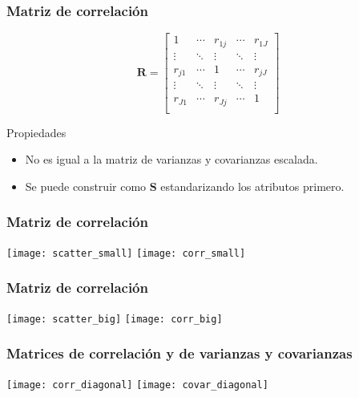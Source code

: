 \documentclass[table]{beamer}
\begin{document}
\begin{frame}
    \frametitle{Matriz de correlación}
    \begin{equation*}
        \mathbf{R} =
        \begin{bmatrix}
            1 & \cdots & r_{1 j} & \cdots & r_{1 J} \\
            \vdots & \ddots & \vdots & \ddots & \vdots \\
            r_{j 1} & \cdots & 1 & \cdots & r_{j J} \\
            \vdots & \ddots & \vdots & \ddots & \vdots \\
            r_{J 1} & \cdots & r_{J j} & \cdots & 1 \\
        \end{bmatrix}
    \end{equation*}
    \begin{block}{Propiedades}
        \begin{itemize}
            \item No es igual a la matriz de varianzas y covarianzas escalada.
            \item Se puede construir como $\mathbf{S}$ estandarizando los atributos primero.
        \end{itemize}
    \end{block}
\end{frame}

\begin{frame}
    \frametitle{Matriz de correlación}
    \begin{center}
        \texttt{[image: scatter\_small]}
        \texttt{[image: corr\_small]}
    \end{center}
\end{frame}

\begin{frame}
    \frametitle{Matriz de correlación}
    \begin{center}
        \texttt{[image: scatter\_big]}
        \texttt{[image: corr\_big]}
    \end{center}
\end{frame}

\begin{frame}
    \frametitle{Matrices de correlación y de varianzas y covarianzas}
    \begin{center}
        \texttt{[image: corr\_diagonal]}
        \texttt{[image: covar\_diagonal]}
    \end{center}
\end{frame}

\iffalse
\begin{frame}[allowframebreaks, noframenumbering]
\frametitle<presentation>{References}
\printbibliography
%
\end{frame}
\fi
\end{document}
